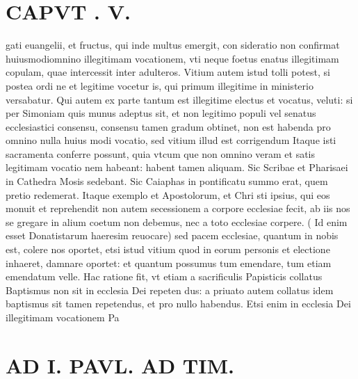 \documentclass{article}
\begin{document}
\begin{pages}
\section*{CAPVT . V. }
\marginpar{[ p.365 ]}\pstart gati euangelii, et fructus, qui inde multus emergit, con sideratio non confirmat huiusmodiomnino illegitimam vocationem, vti neque foetus enatus illegitimam copulam, quae intercessit inter adulteros. Vitium autem istud tolli potest, si postea ordi ne et legitime vocetur is, qui primum illegitime in ministerio versabatur. Qui autem ex parte tantum est illegitime electus et vocatus, veluti: si per Simoniam quis munus adeptus sit, et non legitimo populi vel senatus ecclesiastici consensu, consensu tamen gradum obtinet, non est habenda pro omnino nulla huius modi vocatio, sed vitium illud est corrigendum Itaque isti sacramenta conferre possunt, quia vtcum que non omnino veram et satis legitimam vocatio nem habeant: habent tamen aliquam. Sic Scribae et Pharisaei in Cathedra Mosis sedebant. Sic Caiaphas in pontificatu summo erat, quem pretio redemerat. Itaque exemplo et Apostolorum, et Chri sti ipsius, qui eos monuit et reprehendit non autem secessionem a corpore ecclesiae fecit, ab iis nos se gregare in alium coetum non debemus, nec a toto ecclesiae corpere. ( Id enim esset Donatistarum haeresim reuocare) sed pacem ecclesiae, quantum in nobis est, colere nos oportet, etsi istud vitium quod in eorum personis et electione inhaeret, damnare oportet: et quantum possumus tum emendare, tum etiam emendatum velle. Hac ratione fit, vt etiam a sacrificulis Papisticis collatus Baptismus non sit in ecclesia Dei repeten dus: a priuato autem collatus idem baptismus sit tamen repetendus, et pro nullo habendus. Etsi enim in ecclesia Dei illegitimam vocationem Pa\pend
\section*{AD I. PAVL. AD TIM. }
\marginpar{[ p.326 ]}\pstart {}
{}

\end{pages}
\end{document}
